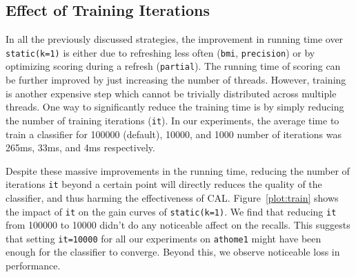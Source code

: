 \subsection*{Effect of Training Iterations}

In all the previously discussed strategies, the improvement in running time over
\texttt{static(k=1)} is either due to refreshing less often (\texttt{bmi},
\texttt{precision}) or by optimizing scoring during a refresh
(\texttt{partial}). The running time of scoring can be further improved by just
increasing the number of threads. However, training is another expensive step
which cannot be trivially distributed across multiple threads. One way to
significantly reduce the training time is by simply reducing the number of
training iterations (\texttt{it}). In our experiments, the average time to train a classifier
for 100000 (default), 10000, and 1000 number of iterations was 265ms, 33ms, and
4ms respectively.

Despite these massive improvements in the running time, reducing the number of
iterations \texttt{it} beyond a certain point will directly
reduces the quality of the classifier, and thus harming the effectiveness of
CAL. Figure~\ref{plot:train} shows the impact of \texttt{it} on the gain curves
of \texttt{static(k=1)}. We find that reducing \texttt{it} from 100000 to 10000
didn't do any noticeable affect on the recalls. This suggests that setting
\texttt{it=10000} for all our experiments on \texttt{athome1} might have been
enough for the classifier to converge. Beyond this, we observe noticeable loss in
performance.

